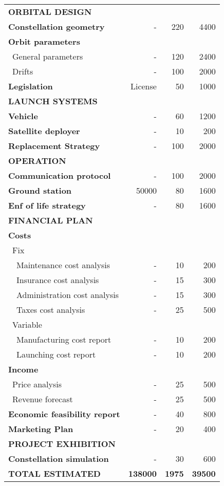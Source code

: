 \begin{longtable}{| l | r | r |r | }
\rowcolor[gray]{0.85}	\textbf{ORBITAL DESIGN} & &  & \\

	\textbf{Constellation geometry} & - & 220  & 4400  \\
	\hline
	\textbf{Orbit parameters} & &   &  \\
	   \blue ~General parameters & - & 120 & 2400 \\
	   \blue ~Drifts & - & 100  & 2000  \\
	\hline
	\textbf{Legislation} & License & 50 & 1000 \\
   
\rowcolor[gray]{0.85} \textbf{LAUNCH SYSTEMS} & &  &   \\
	
	\textbf{Vehicle} & - & 60 & 1200 \\
	\hline
	\textbf{Satellite deployer} & - & 10 & 200  \\
	\hline
	\textbf{Replacement Strategy} & - & 100 & 2000  \\
	
\rowcolor[gray]{0.85} \textbf{OPERATION} & &  &  \\
	
	\textbf{Communication protocol} & - & 100 & 2000 \\
	\hline
	\textbf{Ground station} & 50000 & 80 & 1600 \\
	\hline
	\textbf{Enf of life strategy} & - & 80  & 1600 \\
	\hline

\pagebreak

	\hline
\rowcolor[gray]{0.85} \textbf{FINANCIAL PLAN} & &  & \\
	
	\textbf{Costs} & & & \\
	   \blue ~Fix & &  &   \\
	   ~~Maintenance cost analysis & - & 10 & 200 \\
	   ~~Insurance cost analysis & - & 15 & 300 \\
	   ~~Administration cost analysis & - & 15 & 300 \\
	   ~~Taxes cost analysis & - & 25 & 500 \\
	   \blue ~Variable & &  & \\
	   ~~Manufacturing cost report & - & 10 & 200 \\
	   ~~Launching cost report & - & 10 & 200 \\
	\hline
	\textbf{Income} & & &  \\
	   \blue ~Price analysis & - & 25  & 500  \\
	   \blue ~Revenue forecast & - & 25  & 500  \\
	\hline
	\textbf{Economic feasibility report} & - & 40 & 800 \\
	\hline
	\textbf{Marketing Plan} & - & 20 & 400 \\
\rowcolor[gray]{0.85} \textbf{PROJECT EXHIBITION} & & &  \\

	\textbf{Constellation simulation} & - & 30 & 600 \\

\rowcolor[gray]{0.65} \textbf{TOTAL ESTIMATED} & \textbf{138000} & \textbf{1975} & \textbf{39500} \\
    \hline

\end{longtable}